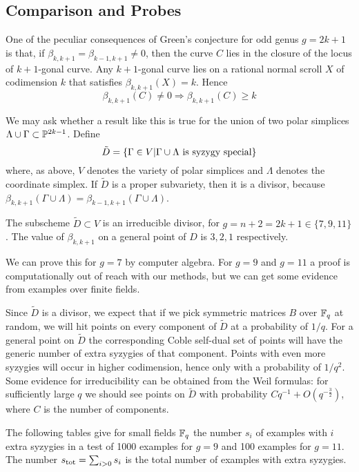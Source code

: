 \subsection{Comparison and Probes}

One of the peculiar consequences of Green's conjecture for odd genus $g=2k+1$ 
is that, if $\beta_{k,k+1} = \beta_{k-1,k+1} \ne 0$, then the curve $C$ lies 
in the closure of the locus of $k+1$-gonal curve. Any $k+1$-gonal curve
lies on a rational normal 
scroll $X$ of codimension $k$ that satisfies 
$\beta_{k,k+1}(X) = k$. Hence
$$\beta_{k,k+1}(C) \ne 0 \Rightarrow \beta_{k,k+1}(C) \ge k$$

We may ask whether a result like this is true for the union of two polar simplices $\Lambda \cup \Gamma \subset {\mathbb P}^{2k-1}$. Define
$$\tilde D=\{ \Gamma \in V | \Gamma \cup \Lambda \hbox{ is syzygy special} \}$$
where, as above, $V$ denotes the variety of polar simplices and 
$\Lambda$ denotes the coordinate simplex. 
If $\tilde D$ is a proper subvariety, then it is a divisor,
because 
$\beta_{k,k+1}(\Gamma \cup \Lambda) =\beta_{k-1,k+1}(\Gamma \cup \Lambda) $. 


\begin{conjecture}\label{Exceptional locus}  The subscheme 
$\tilde D \subset V$ is an irreducible divisor, 
for $g=n+2=2k+1 \in \{7,9,11\}$. 
The value of $\beta_{k,k+1}$ on a general point of $D$ 
is $3, 2, 1$ respectively.
\end{conjecture} 

We can prove this for $g=7$ by computer algebra.  For
$g=9$ and $g=11$ a proof is
computationally out of reach with our methods, but we can get some
evidence from examples over finite fields.

Since $\tilde D$ is a divisor, we expect that if we pick symmetric
matrices $B$ over ${\mathbb F}_q$ at random, we will hit points on every component
of $\tilde D$ at a
probability of $1/q$. For a general point on $ \tilde D$  the corresponding Coble
self-dual set of points will have the generic  number of extra syzygies
of that component. Points with even more syzygies will occur in higher 
codimension, hence only with a probability of $1/q^2$. 
Some evidence for irreducibility can be obtained from the Weil formulas:
for sufficiently large $q$ we should see points on $\tilde D$ with
probability
$C q^{-1} + O(q^{-\frac32})$, where $C$ is the number of components.
 
The following tables give for small fields ${\mathbb F}_q$ the number $s_i$
of examples with $i$ extra syzygies in a test of 1000 examples for $g=9$ and
100 examples for $g=11$. 
The number $s_{\rm tot}= \sum_{i>0} s_i$ is the total number of examples with extra
syzygies.

